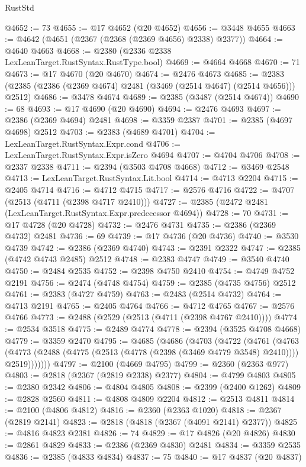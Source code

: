 \begin{lexlean}{RustStd}
\begin{coremodule}
{\begin{coremodule}
{{{{{{{{{{{{{{{{{{{{{{{{{{{{{{{{{{{{{{{{{{{{{{{{{{@4652 := 73
@4655 := @17 @4652 (@20 @4652)
@4656 := @3448 @4655
@4663 := @4642 (@4651 (@2367 (@2368 (@2369 @4656) @2338) @2377))
@4664 := @4640 @4663
@4668 := @2380 (@2336 @2338 LexLeanTarget.RustSyntax.RustType.bool)
@4669 := @4664 @4668
@4670 := 71
@4673 := @17 @4670 (@20 @4670)
@4674 := @2476 @4673
@4685 := @2383 (@2385 (@2386 (@2369 @4674) @2481 (@3469 (@2514 @4647) (@2514 @4656))) @2512)
@4686 := @3478 @4674
@4689 := @2385 (@3487 (@2514 @4674))
@4690 := 68
@4693 := @17 @4690 (@20 @4690)
@4694 := @2476 @4693
@4697 := @2386 (@2369 @4694) @2481
@4698 := @3359 @2387
@4701 := @2385 (@4697 @4698) @2512
@4703 := @2383 (@4689 @4701)
@4704 := LexLeanTarget.RustSyntax.Expr.cond
@4706 := LexLeanTarget.RustSyntax.Expr.isZero @4694
@4707 := @4704 @4706
@4708 := @2337 @2338
@4711 := @2394 (@3503 @4708 @4668)
@4712 := @3469 @2548
@4713 := LexLeanTarget.RustSyntax.Lit.bool
@4714 := @4713 @2204
@4715 := @2405 @4714
@4716 := @4712 @4715
@4717 := @2576 @4716
@4722 := @4707 (@2513 (@4711 (@2398 @4717 @2410)))
@4727 := @2385 (@2472 @2481 (LexLeanTarget.RustSyntax.Expr.predecessor @4694))
@4728 := 70
@4731 := @17 @4728 (@20 @4728)
@4732 := @2476 @4731
@4735 := @2386 (@2369 @4732) @2481
@4736 := 69
@4739 := @17 @4736 (@20 @4736)
@4740 := @3530 @4739
@4742 := @2386 (@2369 @4740)
@4743 := @2391 @2322
@4747 := @2385 (@4742 @4743 @2485) @2512
@4748 := @2383 @4747
@4749 := @3540 @4740
@4750 := @2484 @2535
@4752 := @2398 @4750 @2410
@4754 := @4749 @4752 @2191
@4756 := @2474 (@4748 @4754)
@4759 := @2385 (@4735 @4756) @2512
@4761 := @2383 (@4727 @4759)
@4763 := @2483 (@2514 @4732)
@4764 := @4713 @2191
@4765 := @2405 @4764
@4766 := @4712 @4765
@4767 := @2576 @4766
@4773 := @2488 (@2529 (@2513 (@4711 (@2398 @4767 @2410))))
@4774 := @2534 @3518
@4775 := @2489 @4774
@4778 := @2394 (@3525 @4708 @4668)
@4779 := @3359 @2470
@4795 := @4685
    (@4686
      (@4703
        (@4722
          (@4761
            (@4763
              (@4773 (@2488 (@4775 (@2513 (@4778 (@2398 (@3469 @4779 @3548) @2410)))) @2519)))))))
@4797 := @2100 (@4669 @4795)
@4799 := @2360 (@2363 @977)
@4803 := @2818 (@2367 (@2819 @2338) @2377)
@4804 := @4799 @4803
@4805 := @2380 @2342
@4806 := @4804 @4805
@4808 := @2399 (@2400 @1262)
@4809 := @2828 @2560
@4811 := @4808 @4809 @2204
@4812 := @2513 @4811
@4814 := @2100 (@4806 @4812)
@4816 := @2360 (@2363 @1020)
@4818 := @2367 (@2819 @2141)
@4823 := @2818 (@4818 (@2367 (@4091 @2141) @2377))
@4825 := @4816 @4823 @2381
@4826 := 74
@4829 := @17 @4826 (@20 @4826)
@4830 := @2861 @4829
@4833 := @2386 (@2369 @4830) @2481
@4834 := @3359 @2535
@4836 := @2385 (@4833 @4834)
@4837 := 75
@4840 := @17 @4837 (@20 @4837)
}}}}}}}}}}}}}}}}}}}}}}}}}}}}}}}}}}}}}}}}}}}}}}}}}}
\end{coremodule}}
\end{coremodule}
\end{lexlean}
